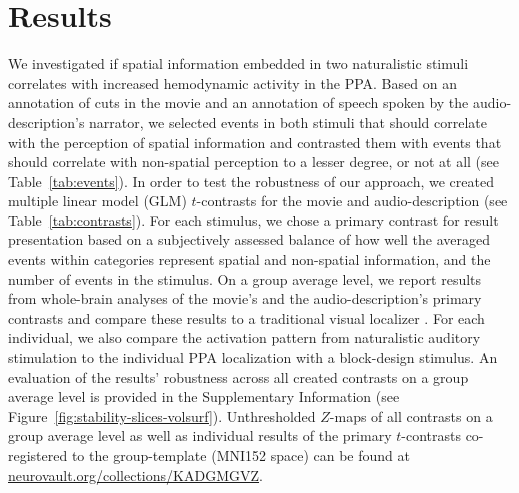 \documentclass[english,11pt]{article}
\begin{document}


\section*{Results}

We investigated if spatial information embedded in two naturalistic stimuli
correlates with increased hemodynamic activity in the PPA.
%
Based on an annotation of cuts in the movie and an annotation of speech spoken
by the audio-description's narrator, we selected events in both stimuli that
should correlate with the perception of spatial information and contrasted them
with events that should correlate with non-spatial
perception to a lesser degree, or not at all (see Table~\ref{tab:events}).
In order to test the robustness of our approach, we created multiple linear
model (GLM) $t$-contrasts for the movie and audio-description (see
Table~\ref{tab:contrasts}).
For each stimulus, we chose a primary contrast for result presentation
based on a subjectively assessed balance of how
well the averaged events within categories represent spatial and non-spatial
information, and the number of events in the stimulus.
On a group average level, we report results from whole-brain analyses of
the movie's and the audio-description's primary contrasts and compare these
results to a traditional visual localizer \citep{sengupta2016extension}.
For each individual, we also compare the activation pattern from naturalistic
auditory stimulation to the individual PPA localization with a block-design
stimulus.
An evaluation of the results' robustness across all created contrasts on a group
average level is provided in the Supplementary Information (see
Figure~\ref{fig:stability-slices-volsurf}).
Unthresholded $Z$-maps of all contrasts on a group average level as well as
individual results of the primary $t$-contrasts co-registered to the
group-template (MNI152 space) can be found at
\href{https://neurovault.org/collections/KADGMGVZ/}{\url{neurovault.org/collections/KADGMGVZ}}.
\end{document}
